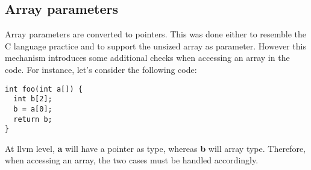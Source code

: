 \documentclass{article}
\begin{document}
\subsection*{Array parameters}
Array parameters are converted to pointers. This was done either to resemble the C language practice
and to support the unsized array as parameter.
However this mechanism introduces some additional checks when accessing an array in the code.
For instance, let's consider the following code:
\begin{lstlisting}[basicstyle=\ttfamily\fontsize{8pt}{14pt}, keywordstyle=\color{blue}, commentstyle=\color{green}]
int foo(int a[]) {
  int b[2];
  b = a[0];
  return b;
}
\end{lstlisting}
At llvm level, \textbf{a} will have a pointer as type, whereas \textbf{b} will array type.
Therefore, when accessing an array, the two cases must be handled accordingly.
\end{document}
